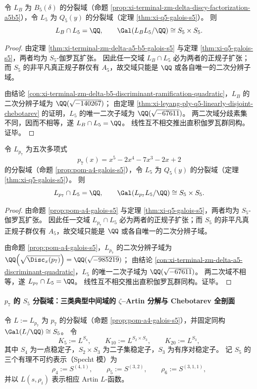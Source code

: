 \begin{conclusion}\label{con:xi-delta-b5-q5-linearly-disjoint-s5xs5}
令 \(L_B\) 为 \(B_5(\delta)\) 的分裂域（命题 \ref{prop:xi-terminal-zm-delta-discy-factorization-a5b5}），令 \(L_5\) 为 \(Q_5(y)\) 的分裂域（定理 \ref{thm:xi-q5-galois-s5}）。
则
\[
L_B\cap L_5=\QQ,
\qquad
\Gal(L_BL_5/\QQ)\cong S_5\times S_5.
\]
\end{conclusion}
\begin{proof}
由定理 \ref{thm:xi-terminal-zm-delta-a5-b5-galois-s5} 与定理 \ref{thm:xi-q5-galois-s5}，两者均为 \(S_5\)-伽罗瓦扩张。
因此任一交域 \(L_B\cap L_5\) 必为两者的正规子扩张；而 \(S_5\) 的非平凡真正规子群仅有 \(A_5\)，故交域只能是 \(\QQ\) 或各自唯一的二次分辨子域。
\par
由结论 \ref{con:xi-terminal-zm-delta-b5-discriminant-ramification-quadratic}，\(L_B\) 的二次分辨子域为 \(\QQ(\sqrt{-140267})\)；
由定理 \ref{thm:xi-leyang-ply-q5-linearly-disjoint-chebotarev} 的证明，\(L_5\) 的唯一二次子域为 \(\QQ(\sqrt{-67611})\)。
两二次域分歧素集不同，因而不相等，遂 \(L_B\cap L_5=\QQ\)。
线性互不相交推出直积伽罗瓦群同构。证毕。
\end{proof}

\begin{conclusion}\label{con:xi-p7-q5-linearly-disjoint-s5xs5}
令 \(L_{p_7}\) 为五次多项式
\[
p_7(x)=x^5-2x^4-7x^3-2x+2
\]
的分裂域（命题 \ref{prop:pom-a4-galois-s5}），令 \(L_5\) 为 \(Q_5(y)\) 的分裂域（定理 \ref{thm:xi-q5-galois-s5}）。
则
\[
L_{p_7}\cap L_5=\QQ,
\qquad
\Gal(L_{p_7}L_5/\QQ)\cong S_5\times S_5.
\]
\end{conclusion}
\begin{proof}
由命题 \ref{prop:pom-a4-galois-s5} 与定理 \ref{thm:xi-q5-galois-s5}，两者均为 \(S_5\)-伽罗瓦扩张。
因此任一交域 \(L_{p_7}\cap L_5\) 必为两者的正规子扩张；而 \(S_5\) 的非平凡真正规子群仅有 \(A_5\)，故交域只能是 \(\QQ\) 或各自唯一的二次分辨子域。
\par
由命题 \ref{prop:pom-a4-galois-s5}，\(L_{p_7}\) 的二次分辨子域为
\(
\QQ\!\left(\sqrt{\Disc_x(p_7)}\right)=\QQ(\sqrt{-985219})
\)；
由结论 \ref{con:xi-terminal-zm-delta-a5-discriminant-quadratic}，\(L_5\) 的唯一二次子域为 \(\QQ(\sqrt{-67611})\)。
两二次域不相等，遂 \(L_{p_7}\cap L_5=\QQ\)。
线性互不相交推出直积伽罗瓦群同构。证毕。
\end{proof}

\paragraph{\texorpdfstring{$p_7$}{p7} 的 \texorpdfstring{$S_5$}{S5} 分裂域：三类典型中间域的 \texorpdfstring{$\zeta$}{zeta}--Artin 分解与 Chebotarev 全剖面}
令 \(L:=L_{p_7}\) 为 \(p_7\) 的分裂域（命题 \ref{prop:pom-a4-galois-s5}），并固定同构 \(\Gal(L/\QQ)\cong S_5\)。
令
\[
K_{5}:=L^{S_4},\qquad
K_{10}:=L^{S_2\times S_3},\qquad
K_{20}:=L^{S_3},
\]
其中 \(S_4\) 为一点稳定子，\(S_2\times S_3\) 为二子集稳定子，\(S_3\) 为有序对稳定子。
记 \(S_5\) 的三个有理不可约表示（Specht 模）为
\[
\rho_{4}:=S^{(4,1)},\qquad
\rho_{5}:=S^{(3,2)},\qquad
\rho_{6}:=S^{(3,1,1)},
\]
并以 \(L(s,\rho_i)\) 表示相应 Artin \(L\)-函数。

